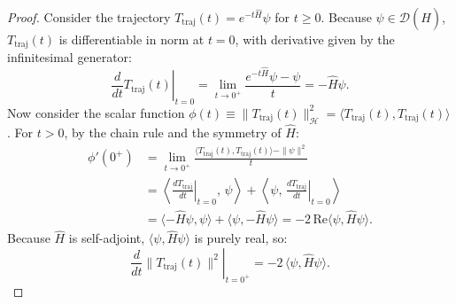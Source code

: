 \begin{proof}
Consider the trajectory $T_{\mathrm{traj}}(t) = e^{-t \hat{H}} \psi$ for $t \ge 0$. Because $\psi \in \mathcal{D}(\hat{H})$, $T_{\mathrm{traj}}(t)$ is differentiable in norm at $t = 0$, with derivative given by the infinitesimal generator:
\begin{equation}
\label{eq:trajectory_derivative_zero}
\left. \frac{d}{dt} T_{\mathrm{traj}}(t) \right|_{t=0} = \lim_{t \to 0^+} \frac{e^{-t \hat{H}} \psi - \psi}{t} = -\hat{H} \psi.
\end{equation}
Now consider the scalar function $\phi(t) \equiv \|T_{\mathrm{traj}}(t)\|_{\mathcal{H}}^2 = \langle T_{\mathrm{traj}}(t), T_{\mathrm{traj}}(t) \rangle$. For $t > 0$, by the chain rule and the symmetry of $\hat{H}$:
\begin{align}
\phi'(0^+) &= \lim_{t \to 0^+} \frac{\langle T_{\mathrm{traj}}(t), T_{\mathrm{traj}}(t) \rangle - \|\psi\|^2}{t} \nonumber \\
&= \left\langle \left. \frac{d T_{\mathrm{traj}}}{dt} \right|_{t=0}, \, \psi \right\rangle + \left\langle \psi, \, \left. \frac{d T_{\mathrm{traj}}}{dt} \right|_{t=0} \right\rangle \nonumber \\
&= \langle -\hat{H}\psi, \psi \rangle + \langle \psi, -\hat{H}\psi \rangle = -2 \, \mathrm{Re} \langle \psi, \hat{H} \psi \rangle.
\end{align}
Because $\hat{H}$ is self-adjoint, $\langle \psi, \hat{H}\psi \rangle$ is purely real, so:
\begin{equation}
\label{eq:norm_derivative_identity}
\left. \frac{d}{dt} \|T_{\mathrm{traj}}(t)\|^2 \right|_{t=0^+} = -2 \, \langle \psi, \hat{H} \psi \rangle.
\end{equation}


\end{proof}
